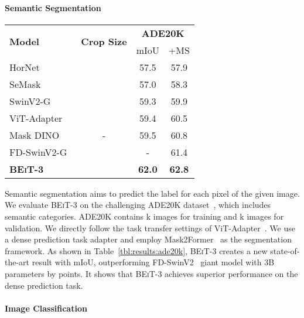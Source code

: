 \documentclass{article}
\newcommand\our{\textsc{BEiT-3}}
\begin{document}
\paragraph{Semantic Segmentation} 

\begin{table*}[t]
\centering
\begin{tabular}{@{}lccc@{}}
\toprule
\multirow{2}{*}{\bf Model} & \multirow{2}{*}{\bf Crop Size} & \multicolumn{2}{c}{\bf ADE20K} \\
 & & mIoU & +MS \\
\midrule
HorNet~\citep{HorNet} &  & 57.5 & 57.9 \\
SeMask~\citep{jain2021semask} &  & 57.0 & 58.3 \\
SwinV2-G~\citep{swinv2} &  & 59.3 & 59.9 \\
ViT-Adapter~\citep{vit-adapter} &  & 59.4 & 60.5 \\
Mask DINO~\citep{mask_dino} & - & 59.5 & 60.8 \\
FD-SwinV2-G~\citep{fd-swin} &  & - & 61.4 \\
\midrule
\bf \our{} &  & \bf 62.0 & \bf 62.8 \\
\bottomrule
\end{tabular}
\caption[Caption protect]{Results of semantic segmentation on ADE20K.
``MS'' is short for multi-scale.
The results of the comparison systems are from the \href{https://paperswithcode.com/sota/semantic-segmentation-on-ade20k}{paperswithcode.com} leaderboard (timestamp: 08/22/2022).
}
\label{tbl:results:ade20k}
\end{table*}

Semantic segmentation aims to predict the label for each pixel of the given image.
We evaluate \our{} on the challenging ADE20K dataset~\citep{ade20k}, which includes  semantic categories.
ADE20K contains k images for training and k images for validation.
We directly follow the task transfer settings of ViT-Adapter~\citep{vit-adapter}.
We use a dense prediction task adapter and employ Mask2Former~\citep{mask2former} as the segmentation framework.
As shown in Table~\ref{tbl:results:ade20k}, \our{} creates a new state-of-the-art result with  mIoU, outperforming FD-SwinV2~\citep{fd-swin} giant model with 3B parameters by  points.
It shows that \our{} achieves superior performance on the dense prediction task.


\paragraph{Image Classification}
\end{document}
